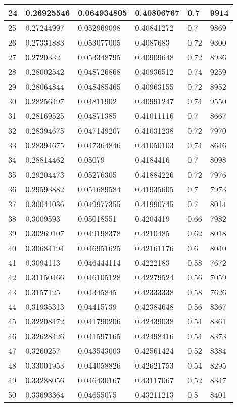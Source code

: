\begin{longtable}{|l|l|l|l|l|l|}
24 & 0.26925546 & 0.064934805 & 0.40806767 & 0.7 & 9914 \\ \hline 
25 & 0.27244997 & 0.052969098 & 0.40841272 & 0.7 & 9869 \\ \hline 
26 & 0.27331883 & 0.053077005 & 0.4087683 & 0.72 & 9300 \\ \hline 
27 & 0.2720332 & 0.053348795 & 0.40909648 & 0.72 & 8936 \\ \hline 
28 & 0.28002542 & 0.048726868 & 0.40936512 & 0.74 & 9259 \\ \hline 
29 & 0.28064844 & 0.048485465 & 0.40963155 & 0.72 & 8952 \\ \hline 
30 & 0.28256497 & 0.04811902 & 0.40991247 & 0.74 & 9550 \\ \hline 
31 & 0.28169525 & 0.04871385 & 0.41011116 & 0.7 & 8667 \\ \hline 
32 & 0.28394675 & 0.047149207 & 0.41031238 & 0.72 & 7970 \\ \hline 
33 & 0.28394675 & 0.047364846 & 0.41050103 & 0.74 & 8646 \\ \hline 
34 & 0.28814462 & 0.05079 & 0.4184416 & 0.7 & 8098 \\ \hline 
35 & 0.29204473 & 0.05276305 & 0.41884226 & 0.72 & 7976 \\ \hline 
36 & 0.29593882 & 0.051689584 & 0.41935605 & 0.7 & 7973 \\ \hline 
37 & 0.30041036 & 0.049977355 & 0.41990745 & 0.7 & 8014 \\ \hline 
38 & 0.3009593 & 0.05018551 & 0.4204419 & 0.66 & 7982 \\ \hline 
39 & 0.30269107 & 0.049198378 & 0.4210485 & 0.62 & 8018 \\ \hline 
40 & 0.30684194 & 0.046951625 & 0.42161176 & 0.6 & 8040 \\ \hline 
41 & 0.3094113 & 0.046444114 & 0.4222183 & 0.58 & 7672 \\ \hline 
42 & 0.31150466 & 0.046105128 & 0.42279524 & 0.56 & 7059 \\ \hline 
43 & 0.3157125 & 0.04345845 & 0.42333338 & 0.58 & 7626 \\ \hline 
44 & 0.31935313 & 0.04415739 & 0.42384648 & 0.56 & 8367 \\ \hline 
45 & 0.32208472 & 0.041790206 & 0.42439038 & 0.54 & 8361 \\ \hline 
46 & 0.32628426 & 0.041597165 & 0.42498416 & 0.54 & 8373 \\ \hline 
47 & 0.3260257 & 0.043543003 & 0.42561424 & 0.52 & 8384 \\ \hline 
48 & 0.33001953 & 0.044058826 & 0.42621753 & 0.54 & 8295 \\ \hline 
49 & 0.33288056 & 0.046430167 & 0.43117067 & 0.52 & 8347 \\ \hline 
50 & 0.33693364 & 0.04655075 & 0.43211213 & 0.5 & 8401 \\ \hline 
\end{longtable}